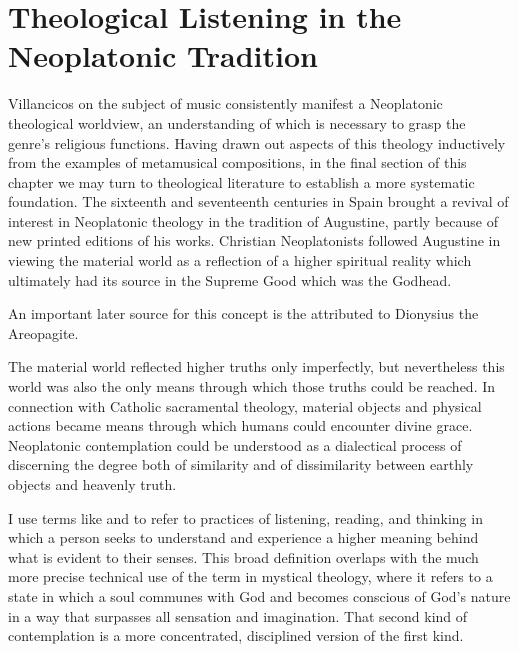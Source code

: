 
\section{Theological Listening in the Neoplatonic Tradition}

Villancicos on the subject of music consistently manifest a Neoplatonic
theological worldview, an understanding of which is necessary to grasp the
genre's religious functions.
Having drawn out aspects of this theology inductively from the examples of
metamusical compositions, in the final section of this chapter we may turn to
theological literature to establish a more systematic foundation.
The sixteenth and seventeenth centuries in Spain brought a revival of interest
in Neoplatonic theology in the tradition of Augustine, partly because of new
printed editions of his works.%
    \Autocite{Weber:ReligiousLitSpain}
Christian Neoplatonists followed Augustine in viewing the material
world as a reflection of a higher spiritual reality which ultimately had its
source in the Supreme Good which was the Godhead.%
\begin{Footnote}
    An important later source for this concept is the  attributed to Dionysius the Areopagite.
\end{Footnote}
The material world reflected higher truths only imperfectly, but nevertheless
this world was also the only means through which those truths could be reached.
In connection with Catholic sacramental theology, material objects and physical
actions became means through which humans could encounter divine grace.
Neoplatonic contemplation could be understood as a dialectical process of
discerning the degree both of similarity and of dissimilarity between earthly
objects and heavenly truth.%
\begin{Footnote}
    I use terms like  and  to
    refer to practices of listening, reading, and thinking in which a person
    seeks to understand and experience a higher meaning behind what is evident
    to their senses. 
    This broad definition overlaps with the much more precise technical use of
    the term  in mystical theology, where it refers to
    a state in which a soul communes with God and becomes conscious of God's
    nature in a way that surpasses all sensation and imagination.
    That second kind of contemplation is a more concentrated, disciplined
    version of the first kind.
\end{Footnote}

